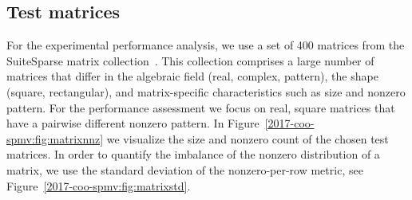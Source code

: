 \subsection{Test matrices}
For the experimental performance analysis, we use a set of 400 matrices from the
SuiteSparse matrix collection~\cite{ufmc}. This collection 
comprises a large number of matrices that differ in the algebraic field (real, complex, pattern),
the shape (square, rectangular), and matrix-specific characteristics such as
size and nonzero pattern.
For the performance assessment we focus on real, square matrices that have a pairwise different nonzero pattern.
In Figure~\ref{2017-coo-spmv:fig:matrixnnz} we visualize the size and nonzero count of the chosen test matrices. 
In order to quantify the imbalance of the nonzero distribution of a matrix,
we use the standard deviation of the nonzero-per-row metric, see Figure~\ref{2017-coo-spmv:fig:matrixstd}.

